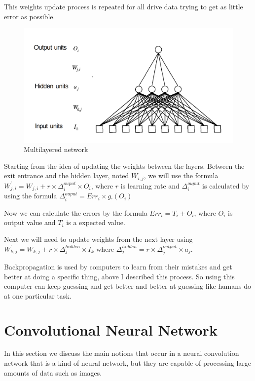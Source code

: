 This weights update process is repeated for all drive data trying to get as little error as possible.


\begin{figure}[htbp]
  \centerline{\includegraphics[scale=0.45]{fig/neuronal-network-backpropagation.png}}  
  \caption{Multilayered network \cite{book.neuronal.network.1995}}
  \label{fig:neuronal-network-backpropagation}
\end{figure}

Starting from the idea of updating the weights between the layers. 
Between the exit entrance and the hidden layer, noted $W_{i,j}$,  we will use the formula 
$W^{'}_{j,i} = W_{j,i} + r \times \Delta_i^{ouput} \times O_i$, where $r$ is learning rate 
and $\Delta_i^{ouput}$ is calculated by using the formula $\Delta_i^{ouput} = Err_i  \times g_{'}(O_i)$

Now we can calculate the errors by the formula $Err_i = T_i + O_i$, where $O_i$ is output value and $T_i$ is a expected value.

Next we will need to update weights from the next layer using $W^{'}_{k,j} = W_{k,j} + r \times \Delta_j^{hidden} \times I_k$ where 
$\Delta_j^{hidden} = r  \times \Delta_j^{output} \times  a_j$.

Backpropagation is used by computers to learn from their mistakes and 
get better at doing a specific thing, above I described this process.
So using this computer can keep guessing and
get better and better at guessing like humans do at one particular task.


\section{Convolutional Neural Network}
In this section we discuss the main notions that occur in 
a neural convolution network that is a  kind of neural network, but they are capable of processing large amounts of data such as images.

